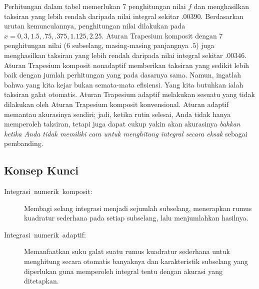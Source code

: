 \noindent Perhitungan dalam tabel memerlukan 7 penghitungan nilai
$f$ dan menghasilkan taksiran yang lebih rendah daripada nilai integral
sekitar $.00390$. Berdasarkan urutan kemunculannya, penghitungan
nilai dilakukan pada $x=0,3,1.5,.75,.375,1.125,2.25$. Aturan Trapesium
komposit dengan 7 penghitungan nilai (6 subselang, masing-masing panjangnya
$.5$) juga menghasilkan taksiran yang lebih rendah daripada nilai
integral sekitar $.00346$. Aturan Trapesium komposit nonadaptif memberikan
taksiran yang sedikit lebih baik dengan jumlah perhitungan yang pada
dasarnya sama. Namun, ingatlah bahwa yang kita kejar bukan semata-mata
efisiensi. Yang kita butuhkan ialah taksiran galat otomatis. Aturan
Trapesium adaptif melakukan sesuatu yang tidak dilakukan oleh Aturan
Trapesium komposit konvensional. Aturan adaptif memantau akurasinya
sendiri; jadi, ketika rutin selesai, Anda tidak hanya memperoleh taksiran,
tetapi juga dapat cukup yakin akan akurasinya \textit{ bahkan ketika
Anda tidak memiliki cara untuk menghitung integral secara eksak} sebagai
pembanding.

\subsection{Konsep Kunci}
\begin{description}
\item [{Integrasi~numerik~komposit:}] Membagi
selang integrasi menjadi sejumlah subselang, menerapkan rumus kuadratur
sederhana pada setiap subselang, lalu menjumlahkan hasilnya.
\item [{Integrasi~numerik~adaptif:}] Memanfaatkan
suku galat suatu rumus kuadratur sederhana untuk menghitung secara
otomatis banyaknya dan karakteristik subselang yang diperlukan guna
memperoleh integral tentu dengan akurasi yang ditetapkan.
\end{description}
\noindent\startexercises 

